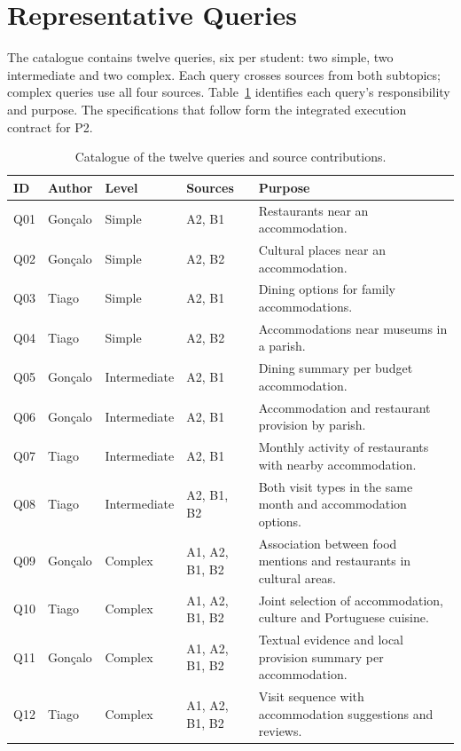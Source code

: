 \section{Representative Queries}\label{sec:consultas}
The catalogue contains twelve queries, six per student: two simple, two intermediate and two complex. Each query crosses sources from both subtopics; complex queries use all four sources. Table~\ref{tab:matriz_consultas} identifies each query's responsibility and purpose. The specifications that follow form the integrated execution contract for P2.
\begin{table}[!htbp]\centering\footnotesize\setlength{\tabcolsep}{4pt}\renewcommand{\arraystretch}{1.1}
\caption{Catalogue of the twelve queries and source contributions.}\label{tab:matriz_consultas}
\begin{tabularx}{\textwidth}{lllp{2.3cm}X}\toprule
\textbf{ID} & \textbf{Author} & \textbf{Level} & \textbf{Sources} & \textbf{Purpose} \\\midrule
Q01 & Gonçalo & Simple & A2, B1 & Restaurants near an accommodation. \\
Q02 & Gonçalo & Simple & A2, B2 & Cultural places near an accommodation. \\
Q03 & Tiago & Simple & A2, B1 & Dining options for family accommodations. \\
Q04 & Tiago & Simple & A2, B2 & Accommodations near museums in a parish. \\
Q05 & Gonçalo & Intermediate & A2, B1 & Dining summary per budget accommodation. \\
Q06 & Gonçalo & Intermediate & A2, B1 & Accommodation and restaurant provision by parish. \\
Q07 & Tiago & Intermediate & A2, B1 & Monthly activity of restaurants with nearby accommodation. \\
Q08 & Tiago & Intermediate & A2, B1, B2 & Both visit types in the same month and accommodation options. \\
Q09 & Gonçalo & Complex & A1, A2, B1, B2 & Association between food mentions and restaurants in cultural areas. \\
Q10 & Tiago & Complex & A1, A2, B1, B2 & Joint selection of accommodation, culture and Portuguese cuisine. \\
Q11 & Gonçalo & Complex & A1, A2, B1, B2 & Textual evidence and local provision summary per accommodation. \\
Q12 & Tiago & Complex & A1, A2, B1, B2 & Visit sequence with accommodation suggestions and reviews. \\\bottomrule
\end{tabularx}\end{table}
